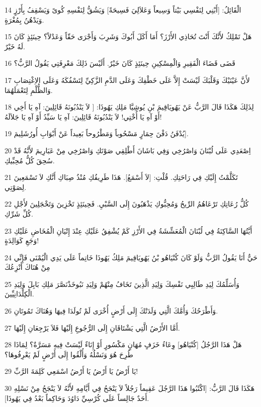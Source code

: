 \par 14 الْقَائِلُ: [أَبْنِي لِنَفْسِي بَيْتاً وَسِيعاً وَعَلاَلِيَ فَسِيحَةً] وَيَشُقُّ لِنَفْسِهِ كُوىً وَيَسْقِفُ بِأَرْزٍ وَيَدْهُنُ بِمُغْرَةٍ.
\par 15 هَلْ تَمْلِكُ لأَنَّكَ أَنْتَ تُحَاذِي الأَرْزَ؟ أَمَا أَكَلَ أَبُوكَ وَشَرِبَ وَأَجْرَى حَقّاً وَعَدْلاً؟ حِينَئِذٍ كَانَ لَهُ خَيْرٌ.
\par 16 قَضَى قَضَاءَ الْفَقِيرِ وَالْمِسْكِينِ حِينَئِذٍ كَانَ خَيْرٌ. أَلَيْسَ ذَلِكَ مَعْرِفَتِي يَقُولُ الرَّبُّ؟
\par 17 لأَنَّ عَيْنَيْكَ وَقَلْبَكَ لَيْسَتْ إِلاَّ عَلَى خَطْفِكَ وَعَلَى الدَّمِ الزَّكِيِّ لِتَسْفُكَهُ وَعَلَى الاِغْتِصَابِ وَالظُّلْمِ لِتَعْمَلَهُمَا.
\par 18 لِذَلِكَ هَكَذَا قَالَ الرَّبُّ عَنْ يَهُويَاقِيمَ بْنِ يُوشِيَّا مَلِكِ يَهُوذَا: [ لاَ يَنْدُبُونَهُ قَائِلِينَ: آهِ يَا أَخِي أَوْ آهِ يَا أُخْتِي! لاَ يَنْدُبُونَهُ قَائِلِينَ: آهِ يَا سَيِّدُ أَوْ آهِ يَا جَلاَلَهُ!
\par 19 يُدْفَنُ دَفْنَ حِمَارٍ مَسْحُوباً وَمَطْرُوحاً بَعِيداً عَنْ أَبْوَابِ أُورُشَلِيمَ].
\par 20 اِصْعَدِي عَلَى لُبْنَانَ وَاصْرُخِي وَفِي بَاشَانَ أَطْلِقِي صَوْتَكِ وَاصْرُخِي مِنْ عَبَارِيمَ لأَنَّهُ قَدْ سُحِقَ كُلُّ مُحِبِّيكِ.
\par 21 تَكَلَّمْتُ إِلَيْكِ فِي رَاحَتِكِ. قُلْتِ: [لاَ أَسْمَعُ]. هَذَا طَرِيقُكِ مُنْذُ صِبَاكِ أَنَّكِ لاَ تَسْمَعِينَ لِصَوْتِي.
\par 22 كُلُّ رُعَاتِكِ تَرْعَاهُمُ الرِّيحُ وَمُحِبُّوكِ يَذْهَبُونَ إِلَى السَّبْيِ. فَحِينَئِذٍ تَخْزِينَ وَتَخْجَلِينَ لأَجْلِ كُلِّ شَرِّكِ.
\par 23 أَيَّتُهَا السَّاكِنَةُ فِي لُبْنَانَ الْمُعَشِّشَةُ فِي الأَرْزِ كَمْ يُشْفِقُ عَلَيْكِ عِنْدَ إِتْيَانِ الْمُخَاضِ عَلَيْكِ وَجَعِ كَوَالِدَةٍ!
\par 24 حَيٌّ أَنَا يَقُولُ الرَّبُّ وَلَوْ كَانَ كُنْيَاهُو بْنُ يَهُويَاقِيمَ مَلِكُ يَهُوذَا خَاتِماً عَلَى يَدِي الْيُمْنَى فَإِنِّي مِنْ هُنَاكَ أَنْزِعُكَ
\par 25 وَأُسَلِّمُكَ لِيَدِ طَالِبِي نَفْسِكَ وَلِيَدِ الَّذِينَ تَخَافُ مِنْهُمْ وَلِيَدِ نَبُوخَذْنَصَّرَ مَلِكِ بَابِلَ وَلِيَدِ الْكِلْدَانِيِّينَ.
\par 26 وَأَطْرَحُكَ وَأُمَّكَ الَّتِي وَلَدَتْكَ إِلَى أَرْضٍ أُخْرَى لَمْ تُولَدَا فِيهَا وَهُنَاكَ تَمُوتَانِ.
\par 27 أَمَّا الأَرْضُ الَّتِي يَشْتَاقَانِ إِلَى الرُّجُوعِ إِلَيْهَا فَلاَ يَرْجِعَانِ إِلَيْهَا.
\par 28 هَلْ هَذَا الرَّجُلُ [كُنْيَاهُو] وِعَاءُ خَزَفٍ مُهَانٍ مَكْسُورٍ أَوْ إِنَاءٌ لَيْسَتْ فِيهِ مَسَرَّةٌ؟ لِمَاذَا طُرِحَ هُوَ وَنَسْلُهُ وَأُلْقُوا إِلَى أَرْضٍ لَمْ يَعْرِفُوهَا؟
\par 29 يَا أَرْضُ يَا أَرْضُ يَا أَرْضُ اسْمَعِي كَلِمَةَ الرَّبِّ!
\par 30 هَكَذَا قَالَ الرَّبُّ: [اكْتُبُوا هَذَا الرَّجُلَ عَقِيماً رَجُلاً لاَ يَنْجَحُ فِي أَيَّامِهِ لأَنَّهُ لاَ يَنْجَحُ مِنْ نَسْلِهِ أَحَدٌ جَالِساً عَلَى كُرْسِيِّ دَاوُدَ وَحَاكِماً بَعْدُ فِي يَهُوذَا].

